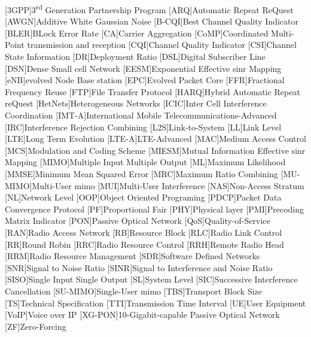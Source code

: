 \documentclass[conference]{IEEEtran}
\begin{document}
\begin{acronym}

[3GPP]{3\textsuperscript{rd} Generation Partnership Program}
[ARQ]{Automatic Repeat ReQuest}
[AWGN]{Additive White Gaussian Noise}
[B-CQI]{Best Channel Quality Indicator}
[BLER]{BLock Error Rate}
[CA]{Carrier Aggregation}
[CoMP]{Coordinated Multi-Point transmission and reception}
[CQI]{Channel Quality Indicator}
[CSI]{Channel State Information}
[DR]{Deployment Ratio}
[DSL]{Digital Subscriber Line}
[DSN]{Dense Small cell Network}
[EESM]{Exponential Effective \ac{sinr} Mapping}
[eNB]{evolved Node Base station} [EPC]{Evolved Packet Core}
[FFR]{Fractional Frequency Reuse}
[FTP]{File Transfer Protocol}
[HARQ]{Hybrid Automatic Repeat reQuest}
[HetNets]{Heterogeneous Networks}
[ICIC]{Inter Cell Interference Coordination}
[IMT-A]{International Mobile Telecommunications-Advanced}
[IRC]{Interference Rejection Combining}
[L2S]{Link-to-System}
[LL]{Link Level}
[LTE]{Long Term Evolution}
[LTE-A]{LTE-Advanced}
[MAC]{Medium Access Control}
[MCS]{Modulation and Coding Scheme}
[MIESM]{Mutual Information Effective \ac{sinr} Mapping}
[MIMO]{Multiple Input Multiple Output}
[ML]{Maximum Likelihood}
[MMSE]{Minimum Mean Squared Error}
[MRC]{Maximum Ratio Combining}
[MU-MIMO]{Multi-User \ac{mimo}}
[MUI]{Multi-User Interference}
[NAS]{Non-Access Stratum}
[NL]{Network Level}
[OOP]{Object Oriented Programing}
[PDCP]{Packet Data Convergence Protocol}
[PF]{Proportional Fair}
[PHY]{Physical layer} [PMI]{Precoding Matrix Indicator}
[PON]{Passive Optical Network}
[QoS]{Quality-of-Service}
[RAN]{Radio Access Network}
[RB]{Resource Block}
[RLC]{Radio Link Control}
[RR]{Round Robin}
[RRC]{Radio Resource Control}
[RRH]{Remote Radio Head}
[RRM]{Radio Resource Management}
[SDR]{Software Defined Networks}
[SNR]{Signal to Noise Ratio}
[SINR]{Signal to Interference and Noise Ratio}
[SISO]{Single Input Single Output}
[SL]{System Level}
[SIC]{Successive Interference Cancellation}
[SU-MIMO]{Single-User \ac{mimo}}
[TBS]{Transport Block Size}
[TS]{Technical Specification}
[TTI]{Transmission Time Interval}
[UE]{User Equipment}
[VoIP]{Voice over IP}
[XG-PON]{10-Gigabit-capable Passive Optical Network}
[ZF]{Zero-Forcing}

\end{acronym}
\end{document}
